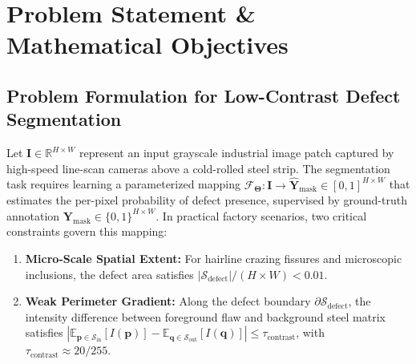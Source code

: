\documentclass{ieeeaccess}
\begin{document}
\section{Problem Statement \& Mathematical Objectives}
\label{sec:problem_statement}

\subsection{Problem Formulation for Low-Contrast Defect Segmentation}
Let $\mathbf{I} \in \mathbb{R}^{H \times W}$ represent an input grayscale industrial image patch captured by high-speed line-scan cameras above a cold-rolled steel strip. The segmentation task requires learning a parameterized mapping $\mathcal{F}_{\boldsymbol{\Theta}}: \mathbf{I} \to \hat{\mathbf{Y}}_{\text{mask}} \in [0, 1]^{H \times W}$ that estimates the per-pixel probability of defect presence, supervised by ground-truth annotation $\mathbf{Y}_{\text{mask}} \in \{0, 1\}^{H \times W}$. In practical factory scenarios, two critical constraints govern this mapping:
\begin{enumerate}
    \item \textbf{Micro-Scale Spatial Extent:} For hairline crazing fissures and microscopic inclusions, the defect area satisfies $|\mathcal{S}_{\text{defect}}| / (H \times W) < 0.01$.
    \item \textbf{Weak Perimeter Gradient:} Along the defect boundary $\partial \mathcal{S}_{\text{defect}}$, the intensity difference between foreground flaw and background steel matrix satisfies $|\mathbb{E}_{\mathbf{p} \in \mathcal{S}_{\text{in}}}[I(\mathbf{p})] - \mathbb{E}_{\mathbf{q} \in \mathcal{S}_{\text{out}}}[I(\mathbf{q})]| \le \tau_{\text{contrast}}$, with $\tau_{\text{contrast}} \approx 20/255$.
\end{enumerate}
\end{document}
